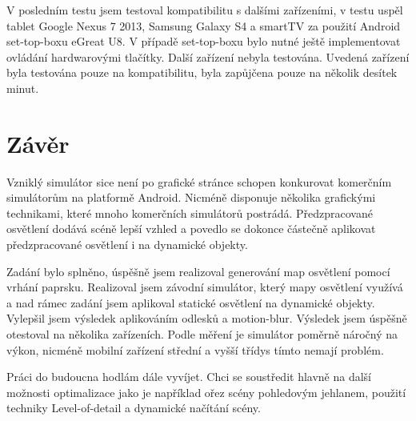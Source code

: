 \documentclass[11pt,twoside,a4paper]{book}
\begin{document}
V posledním testu jsem testoval kompatibilitu s dalšími zařízeními, v testu uspěl tablet Google Nexus 7 2013, Samsung Galaxy S4 a smartTV za použití Android set-top-boxu eGreat U8. V případě set-top-boxu bylo nutné ještě implementovat ovládání hardwarovými tlačítky. Další zařízení nebyla testována. Uvedená zařízení byla testována pouze na kompatibilitu, byla zapůjčena pouze na několik desítek minut.

\chapter{Závěr}
Vzniklý simulátor sice není po grafické stránce schopen konkurovat komerčním simulátorům na platformě Android. Nicméně disponuje několika grafickými technikami, které mnoho komerčních simulátorů postrádá. Předzpracované osvětlení dodává scéně lepší vzhled a povedlo se dokonce částečně aplikovat předzpracované osvětlení i na dynamické objekty.

Zadání bylo splněno, úspěšně jsem realizoval generování map osvětlení pomocí vrhání paprsku. Realizoval jsem závodní simulátor, který mapy osvětlení využívá a nad rámec zadání jsem aplikoval statické osvětlení na dynamické objekty. Vylepšil jsem výsledek aplikováním odlesků a motion-blur. Výsledek jsem úspěšně otestoval na několika zařízeních. Podle měření je simulátor poměrně náročný na výkon, nicméně mobilní zařízení střední a vyšší třídy\linebreak s tímto nemají problém.

Práci do budoucna hodlám dále vyvíjet. Chci se soustředit hlavně na další možnosti optimalizace jako je například ořez scény pohledovým jehlanem, použití techniky Level-of-detail a dynamické načítání scény.


%

%
{
\raggedright

}

%
\end{document}
